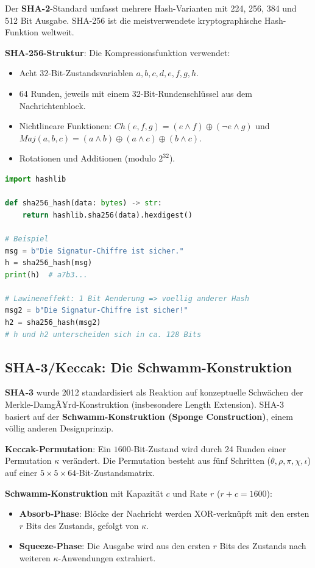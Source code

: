 ﻿\documentclass[a4paper,12pt]{scrreprt}
\theoremstyle{definition}
\begin{document}
Der \textbf{SHA-2}-Standard \cite{NIST15a} umfasst mehrere Hash-Varianten mit 224, 256, 384 und 512 Bit Ausgabe. SHA-256 ist die meistverwendete kryptographische Hash-Funktion weltweit.

\textbf{SHA-256-Struktur}: Die Kompressionsfunktion verwendet:
\begin{itemize}
    \item Acht 32-Bit-Zustandsvariablen $a, b, c, d, e, f, g, h$.
    \item 64 Runden, jeweils mit einem 32-Bit-Rundenschlüssel aus dem Nachrichtenblock.
    \item Nichtlineare Funktionen: $Ch(e,f,g) = (e \wedge f) \oplus (\neg e \wedge g)$ und $Maj(a,b,c) = (a \wedge b) \oplus (a \wedge c) \oplus (b \wedge c)$.
    \item Rotationen und Additionen (modulo $2^{32}$).
\end{itemize}

\begin{lstlisting}[language=Python, caption=SHA-256 Anwendung]
import hashlib

def sha256_hash(data: bytes) -> str:
    return hashlib.sha256(data).hexdigest()

# Beispiel
msg = b"Die Signatur-Chiffre ist sicher."
h = sha256_hash(msg)
print(h)  # a7b3...

# Lawineneffekt: 1 Bit Aenderung => voellig anderer Hash
msg2 = b"Die Signatur-Chiffre ist sicher!"
h2 = sha256_hash(msg2)
# h und h2 unterscheiden sich in ca. 128 Bits
\end{lstlisting}

\subsection{SHA-3/Keccak: Die Schwamm-Konstruktion}

\textbf{SHA-3} \cite{BDPA13} wurde 2012 standardisiert als Reaktion auf konzeptuelle Schwächen der Merkle-DamgÃ¥rd-Konstruktion (insbesondere Length Extension). SHA-3 basiert auf der \textbf{Schwamm-Konstruktion (Sponge Construction)}, einem völlig anderen Designprinzip.

\textbf{Keccak-Permutation}: Ein $1600$-Bit-Zustand wird durch 24 Runden einer Permutation $\kappa$ verändert. Die Permutation besteht aus fünf Schritten ($\theta, \rho, \pi, \chi, \iota$) auf einer $5 \times 5 \times 64$-Bit-Zustandsmatrix.

\textbf{Schwamm-Konstruktion} mit Kapazität $c$ und Rate $r$ ($r + c = 1600$):
\begin{itemize}
    \item \textbf{Absorb-Phase}: Blöcke der Nachricht werden XOR-verknüpft mit den ersten $r$ Bits des Zustands, gefolgt von $\kappa$.
    \item \textbf{Squeeze-Phase}: Die Ausgabe wird aus den ersten $r$ Bits des Zustands nach weiteren $\kappa$-Anwendungen extrahiert.
\end{itemize}
\end{document}
